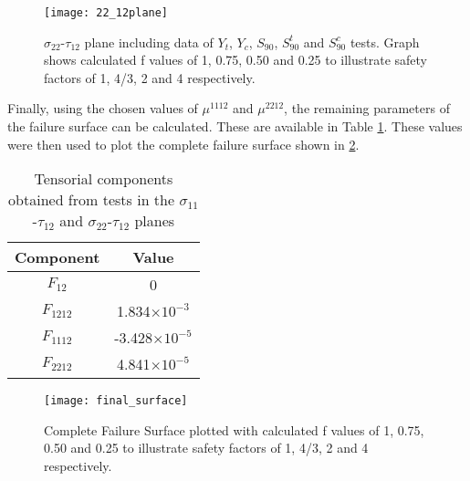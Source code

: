 \documentclass[main.tex]{subfiles}
\begin{document}
\begin{figure}[!htbp]
	\center
	\texttt{[image: 22\_12plane]}
	\captionsetup{justification=centering} %
	\caption[failure envelope in the $\sigma_{22}$-$\tau_{12}$ plane]{$\sigma_{22}$-$\tau_{12}$ plane including data of $Y_t$, $Y_c$, $S_{90}$, $S_{90}^t$ and $S_{90}^c$ tests. Graph shows calculated f values of 1, 0.75, 0.50 and 0.25 to illustrate safety factors of 1, 4/3, 2 and 4 respectively.} \label{fig:2212plane}
\end{figure}

Finally, using the chosen values of $\mu^{1112}$ and $\mu^{2212}$, the remaining parameters of the failure surface can be calculated. These are available in Table \ref{tab:remcalc}. These values were then used to plot the complete failure surface shown in \ref{fig:fullfs}.

\begin{table} [!htbp]
	\centering
	\caption{Tensorial components obtained from tests in the $\sigma_{11}$-$\tau_{12}$ and $\sigma_{22}$-$\tau_{12}$ planes}
	\begin{tabular}{ c c } 
		\toprule
		\textbf{Component} & \textbf{Value} \\
		\midrule
		$F_{12}$ & 0\\
		$F_{1212}$ & 1.834$\times 10^{-3}$\\
		$F_{1112}$ & -3.428$\times 10^{-5}$\\
		$F_{2212}$ & 4.841$\times 10^{-5}$\\
		\bottomrule
	\end{tabular}
	\label{tab:remcalc}
\end{table}  

\begin{figure}[!htbp]
	\center
	\texttt{[image: final\_surface]}
	\captionsetup{justification=centering} %
	\caption[Complete Failure Surface]{Complete Failure Surface plotted with calculated f values of 1, 0.75, 0.50 and 0.25 to illustrate safety factors of 1, 4/3, 2 and 4 respectively.} \label{fig:fullfs}
\end{figure} 


% 

\end{document}
